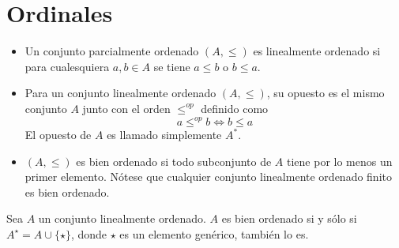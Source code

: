 \chapter{Ordinales}

\begin{definition}
\leavevmode
\begin{itemize}
  \item Un conjunto parcialmente ordenado $(A,\leq)$ es linealmente ordenado si para cualesquiera $a,b\in A$ se tiene $a\leq b$ o $b\leq a$. 

\item Para un conjunto linealmente ordenado $(A,\leq)$, su opuesto es el mismo conjunto $A$ junto con el orden $\leq^{op}$ definido como 
$$a\leq^{op}b\iff b\leq a$$
El opuesto de $A$ es llamado simplemente $A^*$.
\item $(A,\leq)$ es bien ordenado si todo subconjunto de $A$ tiene por lo menos un primer elemento. Nótese que cualquier conjunto linealmente ordenado finito es bien ordenado.
\end{itemize} 
\end{definition}
\begin{lemma}%
    \label{exe:sucesor}
  Sea $A$ un conjunto linealmente ordenado. $A$ es bien ordenado si y sólo si $A^{\star}=A\cup \{\star\}$, donde $\star$ es un elemento genérico, también lo es.
\end{lemma}

